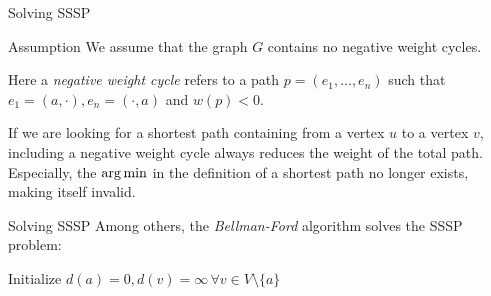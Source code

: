 \begin{frame}{Solving SSSP}
    \begin{exampleblock}{Assumption}
        We assume that the graph $G$ contains no negative weight cycles.

        Here a \emph{negative weight cycle} refers to a path $p = (e_1, \dots, e_n)$ such that $e_1 = (a, \cdot), e_n = (\cdot, a)$ and $w(p) < 0$.

        If we are looking for a shortest path containing from a vertex $u$ to a vertex $v$, including a negative weight cycle always reduces the weight of the total path.
        Especially, the $\operatorname*{arg\,min}$ in the definition of a shortest path no longer exists, making itself invalid. \Lightning{}
    \end{exampleblock}
\end{frame}

\begin{frame}{Solving SSSP}
    Among others, the \emph{Bellman-Ford} algorithm solves the SSSP problem:

    \begin{algorithm}[H]
        Initialize $d(a) = 0, d(v) = \infty \,\forall v \in V \setminus \{ a \}$\;
    \end{algorithm}


\end{frame}

